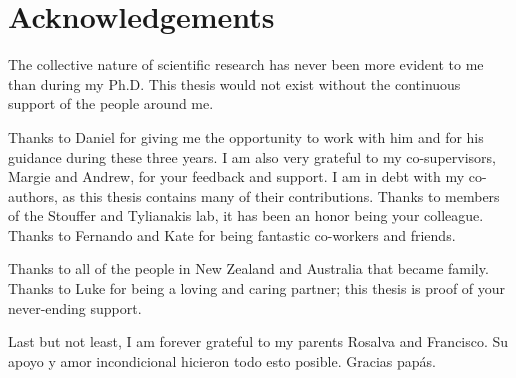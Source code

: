 



\bigskip


\begingroup

\let\clearpage\relax
\let\cleardoublepage\relax
\let\cleardoublepage\relax

\chapter*{Acknowledgements}
The collective nature of scientific research has never been more evident to me than during my Ph.D. This thesis would not exist without the continuous support of the people around me.

Thanks to Daniel for giving me the opportunity to work with him and for his guidance during these three years. I am also very grateful to my co-supervisors, Margie and Andrew, for your feedback and support. I am in debt with my co-authors, as this thesis contains many of their contributions. Thanks to members of the Stouffer and Tylianakis lab, it has been an honor being your colleague.  Thanks to Fernando and Kate for being fantastic co-workers and friends.

Thanks to all of the people in New Zealand and Australia that became family.  Thanks to Luke for being a loving and caring partner; this thesis is proof of your never-ending support.

Last but not least, I am forever grateful to my parents Rosalva and Francisco. Su apoyo y amor incondicional hicieron todo esto posible. Gracias papás.




\endgroup
